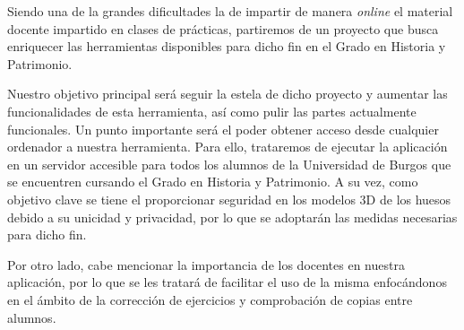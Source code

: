 
Siendo una de la grandes dificultades la de impartir de manera \textit{online} el material docente impartido en clases de prácticas, partiremos de un proyecto que busca enriquecer las herramientas disponibles para dicho fin en el Grado en Historia y Patrimonio.

Nuestro objetivo principal será seguir la estela de dicho proyecto y aumentar las funcionalidades de esta herramienta, así como pulir las partes actualmente funcionales. Un punto importante será el poder obtener acceso desde cualquier ordenador a nuestra herramienta. Para ello, trataremos de ejecutar la aplicación en un servidor accesible para todos los alumnos de la Universidad de Burgos que se encuentren cursando el Grado en Historia y Patrimonio. A su vez, como objetivo clave se tiene el proporcionar seguridad en los modelos 3D de los huesos debido a su unicidad y privacidad, por lo que se adoptarán las medidas necesarias para dicho fin.

Por otro lado, cabe mencionar la importancia de los docentes en nuestra aplicación, por lo que se les tratará de facilitar el uso de la misma enfocándonos en el ámbito de la corrección de ejercicios y comprobación de copias entre alumnos.
